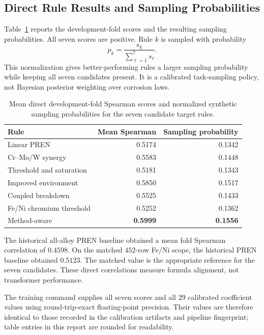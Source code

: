 \documentclass{article}
\begin{document}
\subsection{Direct Rule Results and Sampling Probabilities}
\label{sec:rule-probabilities}

Table~\ref{tab:rule-probabilities} reports the development-fold scores and the
resulting sampling probabilities. All seven scores are positive. Rule \(k\)
is sampled with probability
\begin{equation}
p_k=\frac{s_k}{\sum_{\ell=1}^{7}s_\ell}.
\label{eq:rule-probabilities}
\end{equation}
This normalization gives better-performing rules a larger sampling
probability while keeping all seven candidates present. It is a calibrated
task-sampling policy, not Bayesian posterior weighting over corrosion laws.

\begin{table}[htbp]
\centering
\caption{Mean direct development-fold Spearman scores and normalized
synthetic sampling probabilities for the seven candidate target rules.}
\label{tab:rule-probabilities}
\begin{tabular}{lrr}
\toprule
Rule & Mean Spearman & Sampling probability \\
\midrule
Linear PREN & 0.5174 & 0.1342 \\
Cr--Mo/W synergy & 0.5583 & 0.1448 \\
Threshold and saturation & 0.5181 & 0.1343 \\
Improved environment & 0.5850 & 0.1517 \\
Coupled breakdown & 0.5525 & 0.1433 \\
Fe/Ni chromium threshold & 0.5252 & 0.1362 \\
Method-aware & \textbf{0.5999} & \textbf{0.1556} \\
\bottomrule
\end{tabular}
\end{table}

The historical all-alloy PREN baseline obtained a mean fold Spearman
correlation of \(0.4598\). On the matched \(452\)-row Fe/Ni scope, the
historical PREN baseline obtained \(0.5123\). The matched value is the
appropriate reference for the seven candidates. These direct correlations
measure formula alignment, not transformer performance.

The training command supplies all seven scores and all \(29\) calibrated
coefficient values using round-trip-exact floating-point precision. Their
values are therefore identical to those recorded in the calibration artifacts
and pipeline fingerprint; table entries in this report are rounded for
readability.
\end{document}
